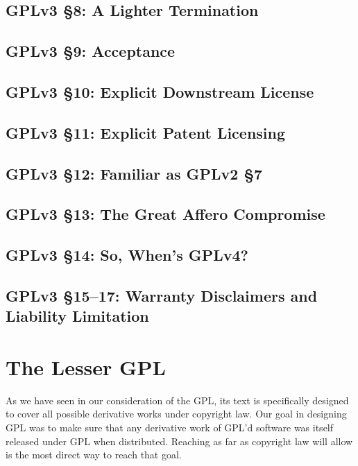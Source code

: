 \section{GPLv3 \S 8: A Lighter Termination}

\section{GPLv3 \S 9: Acceptance}

\section{GPLv3 \S 10: Explicit Downstream License}

\section{GPLv3 \S 11: Explicit Patent Licensing}

\section{GPLv3 \S 12: Familiar as GPLv2 \S 7}

\section{GPLv3 \S 13: The Great Affero Compromise}

\section{GPLv3 \S 14: So, When's GPLv4?}

\section{GPLv3 \S 15--17: Warranty Disclaimers and Liability Limitation}


\chapter{The Lesser GPL}

As we have seen in our consideration of the GPL, its text is specifically
designed to cover all possible derivative works under copyright law. Our
goal in designing GPL was to make sure that any derivative work of GPL'd
software was itself released under GPL when distributed. Reaching as far
as copyright law will allow is the most direct way to reach that goal.

